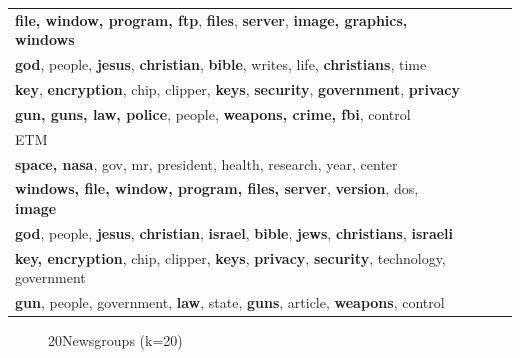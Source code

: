 \begin{table}[ht]
\begin{tabular}{llll}
\textbf{file, window, program, ftp}, \textbf{files}, \textbf{server}, \textbf{image, graphics, windows}\\
\textbf{god}, people, \textbf{jesus}, \textbf{christian}, \textbf{bible}, writes, life, \textbf{christians}, time\\
\textbf{key}, \textbf{encryption}, chip, clipper, \textbf{keys}, \textbf{security}, \textbf{government}, \textbf{privacy}\\
\textbf{gun, guns, law, police}, people, \textbf{weapons, crime, fbi}, control
\\ \hline
\hline
ETM  \\ \hline
\textbf{space, nasa}, gov, mr, president, health, research, year, center\\
\textbf{windows, file, window, program, files, server}, \textbf{version}, dos, \textbf{image}\\
\textbf{god}, people, \textbf{jesus}, \textbf{christian}, \textbf{israel}, \textbf{bible}, \textbf{jews}, \textbf{christians}, \textbf{israeli}\\
\textbf{key, encryption}, chip, clipper, \textbf{keys}, \textbf{privacy}, \textbf{security}, technology, government\\
\textbf{gun}, people, government, \textbf{law}, state, \textbf{guns}, article, \textbf{weapons}, control
\\ \hline
\end{tabular}
\end{table}
\begin{figure}[h]
\centering
{}%
\hfill
{}%
\hfill
\caption{20Newsgroups (k=20)}
\label{fig:loss_20ng_20t}
\end{figure}
